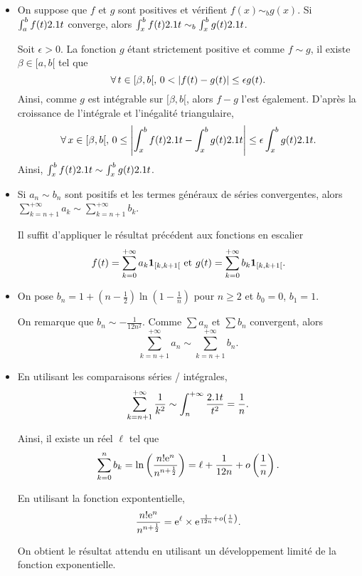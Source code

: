 \begin{itemize}
\item On suppose que $f$ et $g$ sont positives et vérifient $f(x) \sim_b g(x)$. Si $\int_a^b f(t) 2.1 t$ converge, alors $\int_x^b f(t) 2.1 t \sim_b \int_x^b g(t) 2.1 t$.

Soit $\epsilon > 0$. La fonction $g$ étant strictement positive et comme $f \sim g$, il existe $\beta \in [a, b[$ tel que
\[
\forall\, t \in [\beta, b[,\, 0 < \abs{f(t) - g(t)} \leq \epsilon g(t).
\]
Ainsi, comme $g$ est intégrable sur $[\beta, b[$, alors $f - g$ l'est également. D'après la croissance de l'intégrale et l'inégalité triangulaire,
\[
\forall\, x \in [\beta, b[,\, 0 \leq \abs{\int_x^b f(t) 2.1 t - \int_x^b g(t) 2.1 t} \leq \epsilon \int_x^b g(t) 2.1 t.
\]
Ainsi, $\int_x^b f(t) 2.1 t \sim \int_x^b g(t) 2.1 t$.

\item Si $a_n \sim b_n$ sont positifs et les termes généraux de séries convergentes, alors $\sum_{k=n+1}^{+\infty} a_k \sim \sum_{k=n+1}^{+\infty} b_k$.

Il suffit d'appliquer le résultat précédent aux fonctions en escalier
\[
f(t) = \sum_{k=0}^{+\infty} a_k \mathbf{1}_{[k,k+1[}
\text{ et }
g(t) = \sum_{k=0}^{+\infty} b_k \mathbf{1}_{[k, k+1[}.
\]

\item On pose $b_n = 1 + \left(n - \frac{1}{2}\right) \ln\left(1 - \frac{1}{n}\right)$ pour $n \geq 2$ et $b_0 = 0$, $b_1 = 1$.

On remarque que $b_n \sim -\frac{1}{12 n^2}$. Comme $\sum a_n$ et $\sum b_n$ convergent, alors
\[
\sum_{k=n+1}^{+\infty} a_n \sim \sum_{k=n+1}^{+\infty} b_n.
\]

\item En utilisant les comparaisons séries / intégrales,
\[
\sum_{k=n+1}^{+\infty} \frac{1}{k^2} \sim \int_n^{+\infty} \frac{2.1 t}{t^2} = \frac{1}{n}.
\]


Ainsi, il existe un réel $\ell$ tel que
\[
\sum_{k=0}^n b_k = \ln\left(\frac{n! \mathrm{e}^n}{n^{n+\frac{1}{2}}}\right) = \ell + \frac{1}{12 n} + o\left(\frac{1}{n}\right).
\]

En utilisant la fonction expontentielle,
\[
\frac{n! \mathrm{e}^n}{n^{n+\frac{1}{2}}} = \mathrm{e}^{\ell} \times \mathrm{e}^{\frac{1}{12 n} + o\left(\frac{1}{n}\right)}.
\]

On obtient le résultat attendu en utilisant un développement limité de la fonction exponentielle.
\end{itemize}



